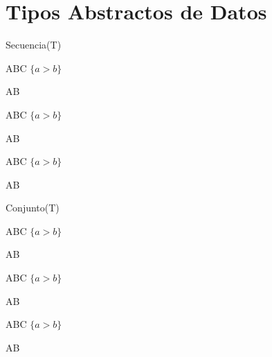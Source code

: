 \documentclass{article}
\begin{document}
\tableofcontents{}\newpage{}

\section{Tipos Abstractos de Datos}
\begin{tad}{Secuencia(T)}
    \begin{observadores}
        \signature{$f$}{A}{B}{C} \hfill{$\{a > b\}$}\par
        \signature{$g$}{A}{B} \par
    \end{observadores}
    
    \begin{generadores}
        \signature{$f$}{A}{B}{C} \hfill{$\{a > b\}$}\par
        \signature{$g$}{A}{B} \par
    \end{generadores}

    \begin{operaciones}
        \signature{$f$}{A}{B}{C} \hfill{$\{a > b\}$}\par
        \signature{$g$}{A}{B} \par
    \end{operaciones}

    \begin{axiomas}
    \end{axiomas}
\end{tad}

\newpage{}

\begin{tad}{Conjunto(T)}
    \begin{observadores}
        \signature{$f$}{A}{B}{C} \hfill{$\{a > b\}$}\par
        \signature{$g$}{A}{B} \par
    \end{observadores}
    
    \begin{generadores}
        \signature{$f$}{A}{B}{C} \hfill{$\{a > b\}$}\par
        \signature{$g$}{A}{B} \par
    \end{generadores}

    \begin{operaciones}
        \signature{$f$}{A}{B}{C} \hfill{$\{a > b\}$}\par
        \signature{$g$}{A}{B} \par
    \end{operaciones}

    \begin{axiomas}
    \end{axiomas}
\end{tad}
\end{document}
